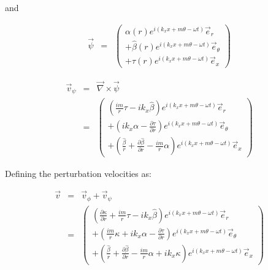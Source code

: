 \documentclass[12pt]{article}
\begin{document}
and

\begin{eqnarray}
\vec{\psi} &=& 
\left(
\begin{array}{r}
\alpha \left(r \right) e^{i \left(k_x x + m \theta - \omega t \right)} \vec{e}_r
\\
+
\widehat{\beta} \left(r \right) e^{i \left(k_x x + m \theta - \omega t \right)} \vec{e}_{\theta}
\\
+
\tau \left(r \right) e^{i \left(k_x x + m \theta - \omega t \right)} \vec{e}_x
\end{array}
\right)
\nonumber
\end{eqnarray}

\begin{eqnarray}
\vec{v}_{\psi}
&=&
\vec{\nabla} \times \vec{\psi}
\nonumber
\\
&=&
\left(
\begin{array}{r}
\left(
\frac{i m}{r}
\tau
-
i k_x \widehat{\beta}
\right) 
e^{i \left(k_x x + m \theta - \omega t \right)}
\vec{e}_r
\\
+\left(
i k_x \alpha
-
\frac{\partial \tau}{\partial r}
\right) 
e^{i \left(k_x x + m \theta - \omega t \right)}
\vec{e}_{\theta}
\\
+\left(
\frac{\widehat{\beta}}{r}
+\frac{\partial \widehat{\beta}}{\partial r}
-
\frac{i m}{r}
\alpha
\right) 
e^{i \left(k_x x + m \theta - \omega t \right)} 
\vec{e}_x
\end{array}
\right)
\nonumber
\end{eqnarray}

Defining the perturbation velocities as:

\begin{eqnarray}
\vec{v} &=& 
\vec{v}_{\phi}
+\vec{v}_{\psi}
\nonumber
\\
&=&
\left(
\begin{array}{r}
\left(
\frac{\partial \kappa}{\partial r}
+
\frac{i m}{r}
\tau
-
i k_x \widehat{\beta}
\right) 
e^{i \left(k_x x + m \theta - \omega t \right)}
\vec{e}_r
\\
+
\left(
\frac{i m}{r} \kappa
+
i k_x \alpha
-
\frac{\partial \tau}{\partial r}
\right) 
e^{i \left(k_x x + m \theta - \omega t \right)}
\vec{e}_{\theta}
\\
+
\left(
\frac{\widehat{\beta}}{r}
+\frac{\partial \widehat{\beta}}{\partial r}
-
\frac{i m}{r}
\alpha
+ i k_x \kappa
\right) 
e^{i \left(k_x x + m \theta - \omega t \right)} 
\vec{e}_x
\end{array}
\right)
\nonumber
\end{eqnarray}
\end{document}
